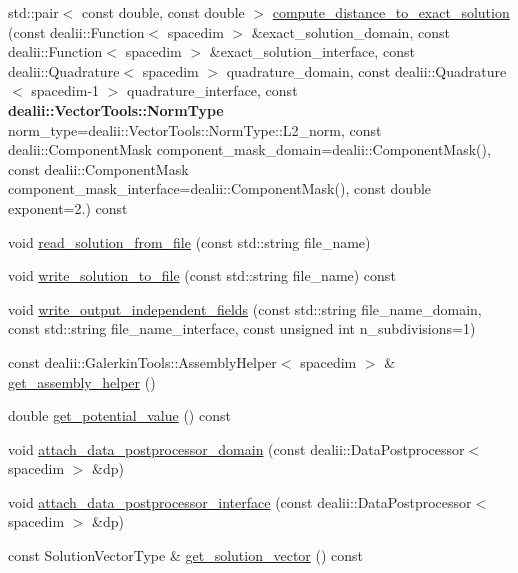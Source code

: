 \begin{DoxyCompactItemize}
\item 
std\+::pair$<$ const double, const double $>$ \hyperlink{classincremental_f_e_1_1_f_e_model_ae785f6ada313fec0811414e3f4294faf}{compute\+\_\+distance\+\_\+to\+\_\+exact\+\_\+solution} (const dealii\+::\+Function$<$ spacedim $>$ \&exact\+\_\+solution\+\_\+domain, const dealii\+::\+Function$<$ spacedim $>$ \&exact\+\_\+solution\+\_\+interface, const dealii\+::\+Quadrature$<$ spacedim $>$ quadrature\+\_\+domain, const dealii\+::\+Quadrature$<$ spacedim-\/1 $>$ quadrature\+\_\+interface, const {\bf dealii\+::\+Vector\+Tools\+::\+Norm\+Type} norm\+\_\+type=dealii\+::\+Vector\+Tools\+::\+Norm\+Type\+::\+L2\+\_\+norm, const dealii\+::\+Component\+Mask component\+\_\+mask\+\_\+domain=dealii\+::\+Component\+Mask(), const dealii\+::\+Component\+Mask component\+\_\+mask\+\_\+interface=dealii\+::\+Component\+Mask(), const double exponent=2.) const 
\item 
void \hyperlink{classincremental_f_e_1_1_f_e_model_acb0d11f9d7a71971732d041a5cb4376a}{read\+\_\+solution\+\_\+from\+\_\+file} (const std\+::string file\+\_\+name)
\item 
void \hyperlink{classincremental_f_e_1_1_f_e_model_a7dd3d4c235f2fd04a41184892e319601}{write\+\_\+solution\+\_\+to\+\_\+file} (const std\+::string file\+\_\+name) const 
\item 
void \hyperlink{classincremental_f_e_1_1_f_e_model_a2e13285d3ec061e14dacaaf174ee5bf5}{write\+\_\+output\+\_\+independent\+\_\+fields} (const std\+::string file\+\_\+name\+\_\+domain, const std\+::string file\+\_\+name\+\_\+interface, const unsigned int n\+\_\+subdivisions=1)
\item 
const dealii\+::\+Galerkin\+Tools\+::\+Assembly\+Helper$<$ spacedim $>$ \& \hyperlink{classincremental_f_e_1_1_f_e_model_a32bc459c2816503c0b70a4f1a6730917}{get\+\_\+assembly\+\_\+helper} ()
\item 
double \hyperlink{classincremental_f_e_1_1_f_e_model_ab557cb22e2a0bd89cc7f0c2d048524ba}{get\+\_\+potential\+\_\+value} () const 
\item 
void \hyperlink{classincremental_f_e_1_1_f_e_model_af838cd26f882b0a70ece37a0199a0384}{attach\+\_\+data\+\_\+postprocessor\+\_\+domain} (const dealii\+::\+Data\+Postprocessor$<$ spacedim $>$ \&dp)
\item 
void \hyperlink{classincremental_f_e_1_1_f_e_model_a021c3223c447ac210a9c994abeaa7495}{attach\+\_\+data\+\_\+postprocessor\+\_\+interface} (const dealii\+::\+Data\+Postprocessor$<$ spacedim $>$ \&dp)
\item 
const Solution\+Vector\+Type \& \hyperlink{classincremental_f_e_1_1_f_e_model_ae9f26087df29cd1355aafbba17d7fedb}{get\+\_\+solution\+\_\+vector} () const 
\end{DoxyCompactItemize}
